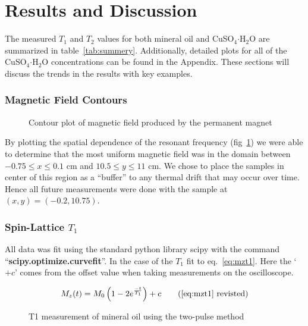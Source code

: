 \documentclass[
reprint,
amsmath,amssymb,
aps,
tikz,
border=5pt
]{revtex4-1}
\newcommand*{\cuso}[1][]{CuSO$_{4} \boldsymbol{\cdot} $H$_2$O }
\newcommand*{\tc}[1][1]{$T_#1$ }
\begin{document}
\section*{Results \lowercase{and} Discussion }

    The measured $T_1$ and $T_2$ values for both mineral oil and \cuso are summarized in table~\ref{tab:summery}. Additionally, detailed plots for all of the \cuso concentrations can be found in the Appendix. These sections will discuss the trends in the results with key examples.
  
\subsubsection*{Magnetic Field Contours}

  \begin{figure}[h]
    \resizebox{0.45\textwidth}{!}{}
    \caption{Contour plot of magnetic field produced by the permanent magnet}
    \label{fig:magContour}
  \end{figure}

  By plotting the spatial dependence of the resonant frequency (fig~\ref{fig:magContour}) we were able to determine that the most uniform magnetic field was in the domain between $-0.75 \leq x \leq 0.1 $ cm and $10.5 \leq y \leq 11 $ cm. We chose to place the samples in center of this region as a ``buffer'' to any thermal drift that may occur over time. Hence all future measurements were done with the sample at $ (x,y) = (-0.2, 10.75)$. 

\subsubsection*{Spin-Lattice $T_1$}

    All data was fit using the standard python library scipy with the command  ``\textbf{scipy.optimize.curve\textunderscore fit}''. In the case of the \tc fit to eq.~\ref{eq:mzt1}. Here the `$+c$' comes from the offset value when taking measurements on the oscilloscope. 

    \begin{gather*}
        M_z(t) = M_0 \left(1-2 e^\frac{-t}{T_1}\right) + c \tag{\ref{eq:mzt1} revisted}
    \end{gather*}

    
    \begin{figure}[b]
        \resizebox{0.45\textwidth}{!}{}
        \caption{T1 measurement of mineral oil using the two-pulse method }
        \label{fig:mo_t1}
      \end{figure}
\end{document}
